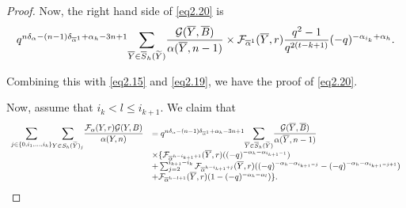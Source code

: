 \documentclass[11pt,oneside]{amsart}
\theoremstyle{plain}
\theoremstyle{definition}
\theoremstyle{remark}
\newcommand{\CF}{{\mathcal F}}
\newcommand{\CG}{{\mathcal G}}
\numberwithin{equation}{section}
\begin{document}
\begin{proof}
		Now, the right hand side of \eqref{eq2.20} is
		\begin{equation*}\begin{array}{l}
				q^{n\delta_{\alpha}-(n-1)\delta_{\overline{\alpha}^1}+\alpha_h-3n+1}\mathlarger{\sum}_{\overline{Y} \in \overline{S}_h(\widetilde{Y})}\dfrac{\CG(\overline{Y},\overline{B})}{\alpha(\overline{Y},n-1)}
				\times\CF_{\overline{\alpha}^{1}}(\overline{Y},r) \dfrac{q^2-1}{q^{2(t-k+1)}}(-q)^{-\alpha_{i_k}+\alpha_h}.
			\end{array}
		\end{equation*}
		
		Combining this with \eqref{eq2.15} and \eqref{eq2.19}, we have the proof of \eqref{eq2.20}.
		
		Now, assume that $i_k < l \leq i_{k+1}$.  We claim that
		\begin{equation}\label{eq2.21}\begin{array}{ll}
				\mathlarger{\sum}_{j \in \lbrace 0,i_1,\dots,i_k \rbrace}\mathlarger{\sum}_{Y \in S_h(\widetilde{Y})_{j}}	\dfrac{\CF_{\alpha}(Y,r)\CG(Y,B)}{\alpha(Y,n)}&=q^{n\delta_{\alpha}-(n-1)\delta_{\overline{\alpha}^1}+\alpha_h-3n+1}\mathlarger{\sum}_{\overline{Y} \in \overline{S}_h(\widetilde{Y})}\dfrac{\CG(\overline{Y},\overline{B})}{\alpha(\overline{Y},n-1)}
				\\ &\times \lbrace \CF_{\overline{\alpha}^{h-i_{k+1}+1}}(\overline{Y},r)((-q)^{-\alpha_h-\alpha_{i_{k+1}-1}})\\
				&+\sum_{j=2}^{i_{k+1}-i_k} \CF_{\overline{\alpha}^{h-i_{k+1}+j}}(\overline{Y},r)((-q)^{-\alpha_h-\alpha_{i_{k+1}-j}}-(-q)^{-\alpha_h-\alpha_{i_{k+1}-j+1}})\\
				&+\CF_{\overline{\alpha}^{h-l+1}}(\overline{Y},r)(1-(-q)^{-\alpha_h-\alpha_{l}}) \rbrace.
			\end{array}
		\end{equation}
		

\end{proof}
\end{document}
